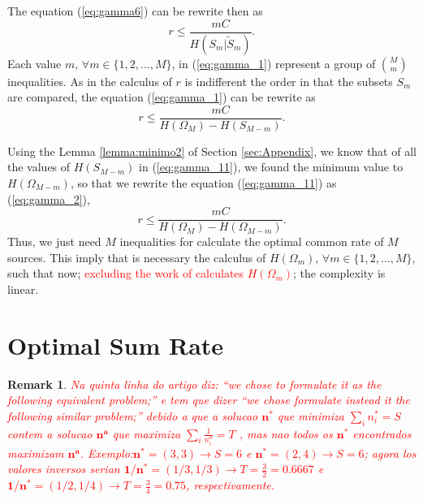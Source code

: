 \documentclass[journal]{IEEEtran}
\newtheorem{remark}[theorem]{Remark}
\begin{document}
The equation (\ref{eq:gamma6}) can be rewrite then as
\begin{equation}\label{eq:gamma_1}
 r \leq   \frac{ m C}{H(S_m|\tilde{S}_m)}.
\end{equation}
Each value $m$, $\forall m \in \{1, 2, ..., M\}$, in (\ref{eq:gamma_1}) 
represent a group of $\binom{M}{m}$ 
inequalities. As in the calculus of $r$ is indifferent the order in that the  
subsets $S_m$ are compared, the equation (\ref{eq:gamma_1}) can be 
rewrite as
\begin{equation}\label{eq:gamma_11}
 r \leq   \frac{ m C}{H(\Omega_M)-H(S_{M-m})}.
\end{equation}


Using the Lemma \ref{lemma:minimo2} of Section \ref{sec:Appendix},
we know that of all the values of $H(S_{M-m})$ in (\ref{eq:gamma_11}), we found the minimum
value to $H(\Omega_{M-m})$, so that we rewrite the equation (\ref{eq:gamma_11}) as (\ref{eq:gamma_2}),
\begin{equation}\label{eq:gamma_2}
 r \leq   \frac{ m C}{H(\Omega_{M}) - H(\Omega_{M-m})}.
\end{equation}
Thus, we just need $M$ inequalities for calculate the optimal common 
rate of $M$ sources. This imply that is necessary the calculus of 
$H(\Omega_m)$, $\forall m \in \{1, 2, ..., M\}$, such that now;
\textcolor{red}{excluding the work of calculates $H(\Omega_m)$}; the complexity is linear.

\section{Optimal Sum Rate} \label{sec:sumrate}
\begin{remark}
\textcolor{red}{Na quinta linha do artigo \cite{fernando} diz: ``we chose to formulate it as the following equivalent problem;'' 
e tem que dizer ``we chose formulate instead it the following similar problem;'' debido a que a solucao $\mathbf{n^*}$
que minimiza $\sum_{i}n^*_i=S$ contem a solucao $\mathbf{n^a}$
que maximiza $\sum_{i}\frac{1}{n^a_i}=T$ , mas nao todos os $\mathbf{n^*}$ encontrados
maximizam $\mathbf{n^a}$. Exemplo:$\mathbf{n^*}=(3,3) \rightarrow S=6$ e $\mathbf{n^*}=(2,4) \rightarrow S=6$; agora
los valores inversos serian $\mathbf{1/n^*}=(1/3,1/3) \rightarrow T=\frac{3}{2}=0.6667$ 
e $\mathbf{1/n^*}=(1/2,1/4) \rightarrow T=\frac{3}{4}=0.75$, respectivamente.}
\end{remark}
\end{document}
